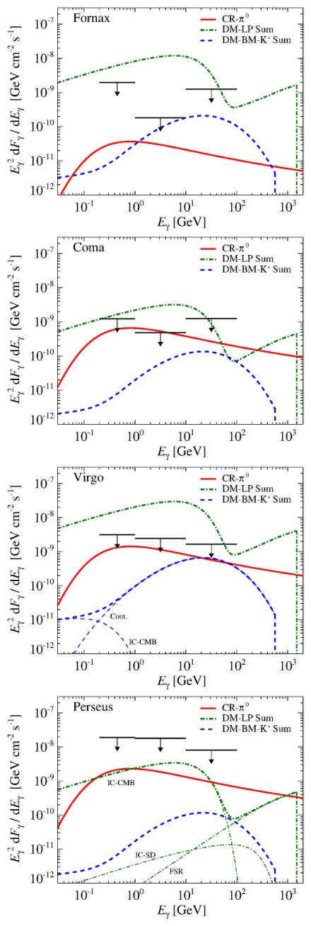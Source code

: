 \documentclass[10pt,aps,pra,reprint,amsmath,amsfonts,amssymb,showpacs]{revtex4-1}
\begin{document}
\begin{figure}
\begin{minipage}{2.0\columnwidth}
 \includegraphics[width=0.49\columnwidth]{figures/flux.cluster.Fornax.v11.0.1deg.1.6T.SubMass.SF300.IR2.noMW.woGal.eps}
\includegraphics[width=0.49\columnwidth]{figures/flux.cluster.Coma.v11.0.1deg.1.6T.SubMass.SF300.IR2.noMW.woGal.eps}
\includegraphics[width=0.49\columnwidth]{figures/flux.cluster.Virgo.v11.0.1deg.1.6T.SubMass.SF300.IR2.noMW.woGal.eps}
\includegraphics[width=0.49\columnwidth]{figures/flux.cluster.Perseus.v11.0.1deg.1.6T.SubMass.SF300.IR2.noMW.woGal.eps}

\end{minipage}
\end{figure}
\end{document}
